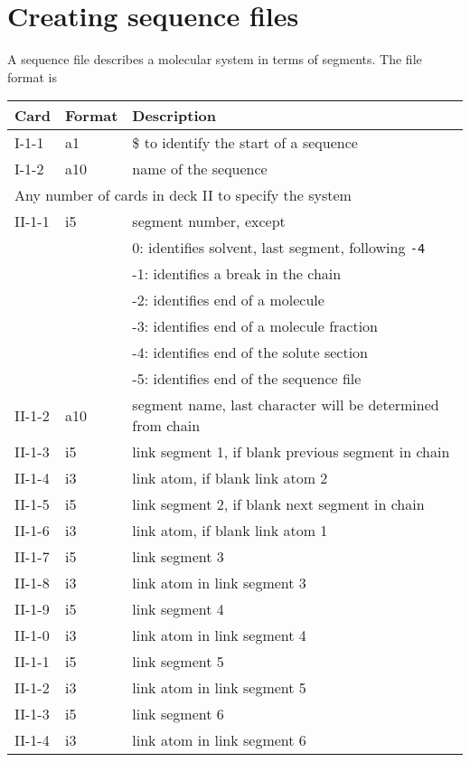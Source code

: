 \section{Creating sequence files}
A sequence file describes a molecular system in terms of segments. The
file format is
\begin{center}
\begin{tabular*}{150mm}{p{12mm}p{12mm}l}
\hline\hline
Card & Format & Description \\ \hline
I-1-1  & a1     & \$ to identify the start of a sequence \\ %
I-1-2  & a10    & name of the sequence\\
\multicolumn{3}{l}{Any number of cards in deck II to specify the system} \\
II-1-1 & i5     & segment number, except\\
       &        &  0: identifies solvent, last segment, following \verb+-4+\\
       &        & -1: identifies a break in the chain\\
       &        & -2: identifies end of a molecule\\
       &        & -3: identifies end of a molecule fraction\\
       &        & -4: identifies end of the solute section\\
       &        & -5: identifies end of the sequence file\\
II-1-2 & a10    & segment name, last character will be determined from chain\\
II-1-3 & i5     & link segment 1, if blank previous segment in chain\\
II-1-4 & i3     & link atom, if blank link atom 2\\
II-1-5 & i5     & link segment 2, if blank next segment in chain\\
II-1-6 & i3     & link atom, if blank link atom 1\\
II-1-7 & i5     & link segment 3\\
II-1-8 & i3     & link atom in link segment 3\\
II-1-9 & i5     & link segment 4\\
II-1-0 & i3     & link atom in link segment 4\\
II-1-1 & i5     & link segment 5\\
II-1-2 & i3     & link atom in link segment 5\\
II-1-3 & i5     & link segment 6\\
II-1-4 & i3     & link atom in link segment 6\\

\end{tabular*}
\end{center}
